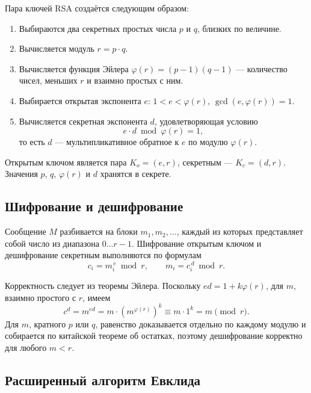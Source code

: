 \documentclass[14pt,a4paper]{extarticle}
\begin{document}
Пара ключей RSA создаётся следующим образом:
\begin{enumerate}
\item Выбираются два секретных простых числа $p$ и $q$, близких по величине.
\item Вычисляется модуль $r = p \cdot q$.
\item Вычисляется функция Эйлера $\varphi(r) = (p - 1)(q - 1)$ --- количество чисел,
меньших $r$ и взаимно простых с ним.
\item Выбирается открытая экспонента $e$: $1 < e < \varphi(r)$, $\gcd(e, \varphi(r)) = 1$.
\item Вычисляется секретная экспонента $d$, удовлетворяющая условию
\begin{equation}
e \cdot d \bmod \varphi(r) = 1,
\end{equation}
то есть $d$ --- мультипликативное обратное к $e$ по модулю $\varphi(r)$.
\end{enumerate}

Открытым ключом является пара $K_o = (e, r)$, секретным --- $K_c = (d, r)$. Значения
$p$, $q$, $\varphi(r)$ и $d$ хранятся в секрете.

\subsection{Шифрование и дешифрование}

Сообщение $M$ разбивается на блоки $m_1, m_2, \dots$, каждый из которых представляет
собой число из диапазона $0 \dots r - 1$. Шифрование открытым ключом и дешифрование
секретным выполняются по формулам
\begin{equation}
c_i = m_i^{\,e} \bmod r, \qquad m_i = c_i^{\,d} \bmod r.
\end{equation}

Корректность следует из теоремы Эйлера. Поскольку $e d = 1 + k \varphi(r)$, для
$m$, взаимно простого с $r$, имеем
\begin{equation}
c^{d} = m^{ed} = m \cdot \left(m^{\varphi(r)}\right)^{k} \equiv m \cdot 1^k = m \pmod r.
\end{equation}
Для $m$, кратного $p$ или $q$, равенство доказывается отдельно по каждому модулю и
собирается по китайской теореме об остатках, поэтому дешифрование корректно для
любого $m < r$.

\subsection{Расширенный алгоритм Евклида}
\end{document}
